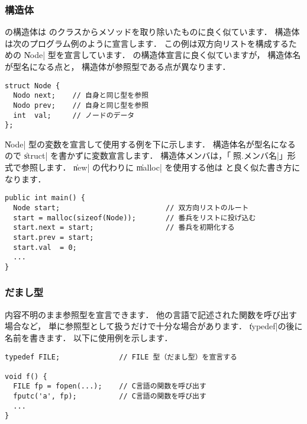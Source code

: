 \subsubsection{構造体}

\label{chap3:struct}
\cmml の構造体は \javal のクラスからメソッドを取り除いたものに良く似ています．
構造体は次のプログラム例のように宣言します．
この例は双方向リストを構成するための \|Node| 型を宣言しています．
\cl の構造体宣言に良く似ていますが，
構造体名が型名になる点と，
構造体が参照型である点が異なります．

\begin{mylist}
\begin{verbatim}
struct Node {
  Nodo next;    // 自身と同じ型を参照
  Nodo prev;    // 自身と同じ型を参照
  int  val;     // ノードのデータ
};
\end{verbatim}
\end{mylist}

\|Node| 型の変数を宣言して使用する例を下に示します．
構造体名が型名になるので \|struct| を書かずに変数宣言します．
構造体メンバは，「\|参照.メンバ名|」形式で参照します．
\|new| の代わりに \|malloc| を使用する他は
\javal と良く似た書き方になります．

\begin{mylist}
\begin{verbatim}
public int main() {
  Node start;                         // 双方向リストのルート
  start = malloc(sizeof(Node));       // 番兵をリストに投げ込む
  start.next = start;                 // 番兵を初期化する
  start.prev = start;
  start.val  = 0;
  ...
}
\end{verbatim}
\end{mylist}

\subsubsection{だまし型}

内容不明のまま参照型を宣言できます．
他の言語で記述された関数を呼び出す場合など，
単に参照型として扱うだけで十分な場合があります．
\|typedef|の後に名前を書きます．
以下に使用例を示します．

\begin{mylist}
\begin{verbatim}
typedef FILE;              // FILE 型（だまし型）を宣言する

void f() {
  FILE fp = fopen(...);    // C言語の関数を呼び出す
  fputc('a', fp);          // C言語の関数を呼び出す
  ...
}
\end{verbatim}
\end{mylist}

